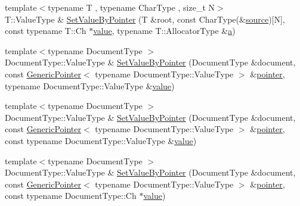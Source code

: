 \begin{DoxyCompactItemize}
\item 
{\footnotesize template$<$typename T , typename Char\+Type , size\+\_\+t N$>$ }\\T\+::\+Value\+Type \& \mbox{\hyperlink{namespacerapidjson_aa637a04f8fc74722bb5aabb0b9567432}{Set\+Value\+By\+Pointer}} (T \&root, const Char\+Type(\&\mbox{\hyperlink{namespacerapidjson_a37a3d95ab06aa7542487bb76e704885c}{source}})\mbox{[}N\mbox{]}, const typename T\+::\+Ch $\ast$\mbox{\hyperlink{namespacerapidjson_a1a75d60792094d496b500c40776030dd}{value}}, typename T\+::\+Allocator\+Type \&\mbox{\hyperlink{namespacerapidjson_a11fce64e721729aaf6be4a485c78f231}{a}})
\item 
{\footnotesize template$<$typename Document\+Type $>$ }\\Document\+Type\+::\+Value\+Type \& \mbox{\hyperlink{namespacerapidjson_a7ee672e29015d1884533b23769c49dee}{Set\+Value\+By\+Pointer}} (Document\+Type \&document, const \mbox{\hyperlink{classrapidjson_1_1_generic_pointer}{Generic\+Pointer}}$<$ typename Document\+Type\+::\+Value\+Type $>$ \&\mbox{\hyperlink{namespacerapidjson_aa5b8c07c8721afe6870a0210820ea19d}{pointer}}, typename Document\+Type\+::\+Value\+Type \&\mbox{\hyperlink{namespacerapidjson_a1a75d60792094d496b500c40776030dd}{value}})
\item 
{\footnotesize template$<$typename Document\+Type $>$ }\\Document\+Type\+::\+Value\+Type \& \mbox{\hyperlink{namespacerapidjson_a17434145e27de11a23d116f832e62b0e}{Set\+Value\+By\+Pointer}} (Document\+Type \&document, const \mbox{\hyperlink{classrapidjson_1_1_generic_pointer}{Generic\+Pointer}}$<$ typename Document\+Type\+::\+Value\+Type $>$ \&\mbox{\hyperlink{namespacerapidjson_aa5b8c07c8721afe6870a0210820ea19d}{pointer}}, const typename Document\+Type\+::\+Value\+Type \&\mbox{\hyperlink{namespacerapidjson_a1a75d60792094d496b500c40776030dd}{value}})
\item 
{\footnotesize template$<$typename Document\+Type $>$ }\\Document\+Type\+::\+Value\+Type \& \mbox{\hyperlink{namespacerapidjson_ae1ed433d2762ea314c3936e0e7b3259b}{Set\+Value\+By\+Pointer}} (Document\+Type \&document, const \mbox{\hyperlink{classrapidjson_1_1_generic_pointer}{Generic\+Pointer}}$<$ typename Document\+Type\+::\+Value\+Type $>$ \&\mbox{\hyperlink{namespacerapidjson_aa5b8c07c8721afe6870a0210820ea19d}{pointer}}, const typename Document\+Type\+::\+Ch $\ast$\mbox{\hyperlink{namespacerapidjson_a1a75d60792094d496b500c40776030dd}{value}})
\item 

\end{DoxyCompactItemize}
